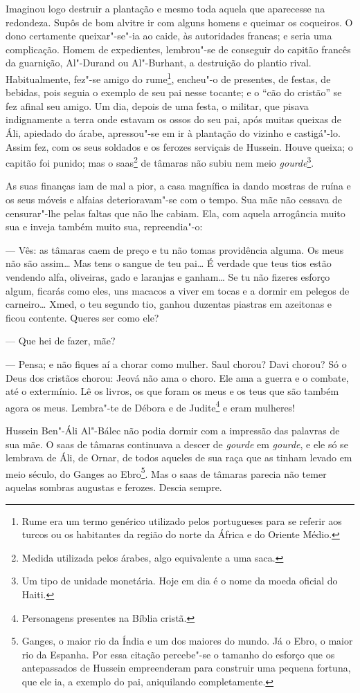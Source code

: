 Imaginou logo destruir a plantação e mesmo toda aquela que aparecesse na
redondeza. Supôs de bom alvitre ir com alguns homens e queimar os
coqueiros. O dono certamente queixar"-se"-ia ao caide, às autoridades
francas; e seria uma complicação. Homem de expedientes, lembrou"-se de
conseguir do capitão francês da guarnição, Al"-Durand ou Al"-Burhant, a
destruição do plantio rival. Habitualmente, fez"-se amigo do
rume\footnote{Rume era um termo genérico utilizado pelos portugueses
  para se referir aos turcos ou os habitantes da região do norte da
  África e do Oriente Médio.}, encheu"-o de presentes, de festas, de
bebidas, pois seguia o exemplo de seu pai nesse tocante; e o ``cão do
cristão'' se fez afinal seu amigo. Um dia, depois de uma festa, o
militar, que pisava indignamente a terra onde estavam os ossos do seu
pai, após muitas queixas de Áli, apiedado do árabe, apressou"-se em ir à
plantação do vizinho e castigá"-lo. Assim fez, com os seus soldados e os
ferozes serviçais de Hussein. Houve queixa; o capitão foi punido; mas o
saas\footnote{Medida utilizada pelos árabes, algo equivalente a uma
  saca.} de tâmaras não subiu nem meio \emph{gourde}\footnote{Um tipo de
  unidade monetária. Hoje em dia é o nome da moeda oficial do Haiti.}.

As suas finanças iam de mal a pior, a casa magnífica ia dando mostras de
ruína e os seus móveis e alfaias deterioravam"-se com o tempo. Sua mãe
não cessava de censurar"-lhe pelas faltas que não lhe cabiam. Ela, com
aquela arrogância muito sua e inveja também muito sua, repreendia"-o:

--- Vês: as tâmaras caem de preço e tu não tomas providência alguma. Os
meus não são assim\ldots{} Mas tens o sangue de teu pai\ldots{} É verdade que teus
tios estão vendendo alfa, oliveiras, gado e laranjas e ganham\ldots{} Se tu
não fizeres esforço algum, ficarás como eles, uns macacos a viver em
tocas e a dormir em pelegos de carneiro\ldots{} Xmed, o teu segundo tio,
ganhou duzentas piastras em azeitonas e ficou contente. Queres ser como
ele?

--- Que hei de fazer, mãe?

--- Pensa; e não fiques aí a chorar como mulher. Saul chorou? Davi
chorou? Só o Deus dos cristãos chorou: Jeová não ama o choro. Ele ama a
guerra e o combate, até o extermínio. Lê os livros, os que foram os meus
e os teus que são também agora os meus. Lembra"-te de Débora e de
Judite\footnote{Personagens presentes na Bíblia cristã.} e eram
mulheres!

Hussein Ben"-Áli Al"-Bálec não podia dormir com a impressão das palavras
de sua mãe. O saas de tâmaras continuava a descer de \emph{gourde} em
\emph{gourde}, e ele só se lembrava de Áli, de Ornar, de todos aqueles
de sua raça que as tinham levado em meio século, do Ganges ao
Ebro\footnote{Ganges, o maior rio da Índia e um dos maiores do mundo. Já
  o Ebro, o maior rio da Espanha. Por essa citação percebe"-se o tamanho
  do esforço que os antepassados de Hussein empreenderam para construir
  uma pequena fortuna, que ele ia, a exemplo do pai, aniquilando
  completamente.}. Mas o saas de tâmaras parecia não temer aquelas
sombras augustas e ferozes. Descia sempre.

